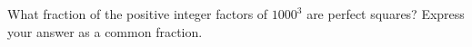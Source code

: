 What fraction of the positive integer factors of $1000^3$ are perfect squares? Express your answer as a common fraction.
